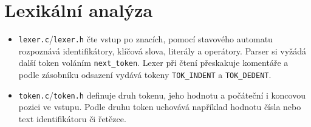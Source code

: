 \section{Lexikální analýza}
\label{sec:lexer}

\begin{itemize}
  \item \texttt{lexer.c}/\texttt{lexer.h} čte vstup po znacích, pomocí stavového automatu rozpoznává identifikátory, klíčová slova, literály a operátory. Parser si vyžádá další token voláním \texttt{next\_token}. Lexer při čtení přeskakuje komentáře a podle zásobníku odsazení vydává tokeny \texttt{TOK\_INDENT} a \texttt{TOK\_DEDENT}.

  \item \texttt{token.c}/\texttt{token.h} definuje druh tokenu, jeho hodnotu a počáteční i koncovou pozici ve vstupu. Podle druhu token uchovává například hodnotu čísla nebo text identifikátoru či řetězce.
\end{itemize}
